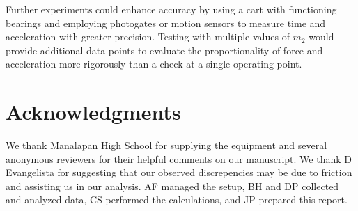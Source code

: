 \documentclass[reprint,amsmath,amssymb,aps,twoside]{revtex4-2}
\begin{document}
Further experiments could enhance accuracy by using a cart with functioning bearings and employing photogates or motion sensors to measure time and acceleration with greater precision. Testing with multiple values of $m_2$ would provide additional data points to evaluate the proportionality of force and acceleration more rigorously than a check at a single operating point. 





\section{Acknowledgments}
We thank Manalapan High School for supplying the equipment and several anonymous reviewers for their helpful comments on our manuscript. We thank D Evangelista for suggesting that our observed discrepencies may be due to friction and assisting us in our analysis. AF managed the setup, BH and DP collected and analyzed data, CS performed the calculations, and JP prepared this report.

%

\end{document}
